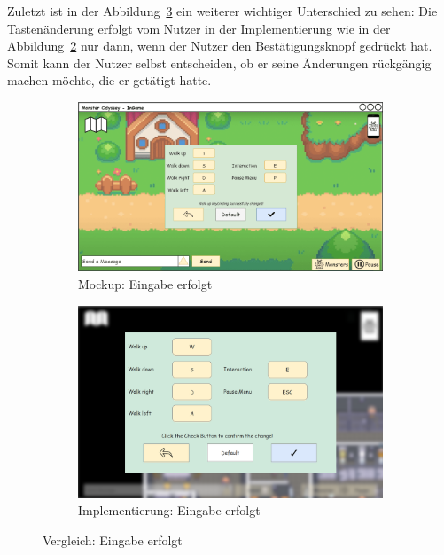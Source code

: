 Zuletzt ist in der Abbildung~\ref{fig: Vergleich: Eingabe erfolgt} ein weiterer wichtiger Unterschied zu sehen: Die Tastenänderung erfolgt vom Nutzer in der Implementierung wie in der Abbildung~\ref{fig: Implementierung: Eingabe erfolgt} nur dann, wenn der Nutzer den Bestätigungsknopf gedrückt hat. Somit kann der Nutzer selbst entscheiden, ob er seine Änderungen rückgängig machen möchte, die er getätigt hatte.
\begin{figure}[H]
    \centering
    \begin{subfigure}[b]{0.4\textwidth}
        \includegraphics[width=\textwidth]{images/mockups/Bonusfeatures/Keybindings/KeybindingsSettingsChanged.png}
        \caption{Mockup: \phantom{aaaaaaa} Eingabe erfolgt}
        \label{fig: Mockup: Eingabe erfolgt}
    \end{subfigure}
    \hfill
    \begin{subfigure}[b]{0.4\textwidth}
        \includegraphics[width=\textwidth]{images/implementation/Bonusfeatures/Keybindings/InputErfolgt.png}
        \caption{Implementierung: Eingabe erfolgt}
        \label{fig: Implementierung: Eingabe erfolgt}
    \end{subfigure}
    \caption{Vergleich: Eingabe erfolgt}
    \label{fig: Vergleich: Eingabe erfolgt}
\end{figure}
